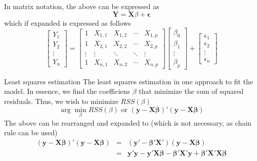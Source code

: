 \documentclass{beamer}
\begin{document}
\begin{frame}
In matrix notation, the above can be expressed as
\begin{equation}\label{eq: LS4}
\bm{Y}=\bm{X}\beta+\bm{\epsilon}
\end{equation}
which if expanded is expressed as follows
\begin{equation}
\begin{bmatrix}
Y_1\\
Y_2\\
\vdots\\
Y_n
\end{bmatrix}=
\begin{bmatrix}
1&X_{1,1}&X_{1,2}&\cdots&X_{1,p}\\
1&X_{2,1}&X_{2,2}&\cdots&X_{2,p}\\
\vdots&\vdots&\ddots&\ddots&\vdots\\
1&X_{n,1}&X_{n,2}&\cdots&X_{n,p}
\end{bmatrix}
\begin{bmatrix}
\beta_0\\
\beta_1\\
\vdots\\
\beta_p
\end{bmatrix}+
\begin{bmatrix}
\epsilon_1\\
\epsilon_2\\
\vdots\\
\epsilon_n
\end{bmatrix}
\end{equation}
\end{frame}

\begin{frame}{Least squares estimation}
The least squares estimation in one approach to fit the model. In essence, we find the coefficiens $\beta$ that minimize the sum of squared residuals.
Thus, we wish to minimize $RSS(\beta)$
\[
\arg \min_{\beta} RSS(\beta)\text{ or }(\bm{y}-\bm{X\beta})'(\bm{y}-\bm{X\beta})
\]
The above can be rearranged and expanded to (which is not necessary, as chain rule can be used)
\begin{eqnarray*}
(\bm{y}-\bm{X\beta})'(\bm{y}-\bm{X\beta})&=&(\bm{y}'-\bm{\beta' X'})(\bm{y}-\bm{X\beta})\\
&=&\bm{y}'\bm{y}-\bm{y}'\bm{X\beta}-\bm{\beta' X'}\bm{y}+\bm{\beta' X'}\bm{X\beta}
\end{eqnarray*}
\end{frame}
\end{document}
